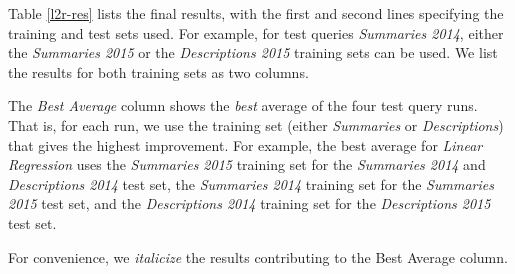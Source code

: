 Table \ref{l2r-res} lists the final results, with the first and second lines
specifying the training and test sets used. For example, for test queries \emph{Summaries 2014},
either the \emph{Summaries 2015} or the \emph{Descriptions 2015} training sets can be used.
We list the results for both training sets as two columns.

The \emph{Best Average} column shows the \emph{best} average of the four test query runs.
That is, for each run, we use the training set (either \emph{Summaries} or \emph{Descriptions}) that gives the highest
improvement. For example, the best average for \emph{Linear Regression} uses the \emph{Summaries 2015} training set for the
\emph{Summaries 2014} and \emph{Descriptions 2014} test set,
the \emph{Summaries 2014} training set for the \emph{Summaries 2015} test set, and
the \emph{Descriptions 2014} training set for the \emph{Descriptions 2015} test set.

For convenience, we \textit{italicize} the results contributing to the Best Average column.

